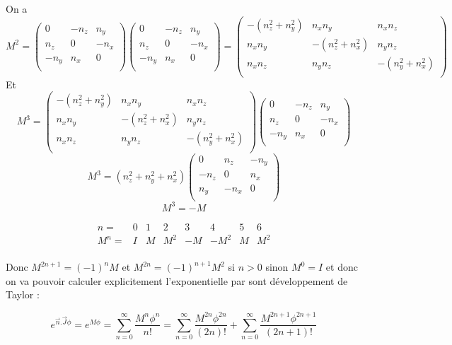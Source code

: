\documentclass[12pt,a4paper]{article}
\begin{document}
	On a 
	\[
	M^2=\begin{pmatrix}
	0&-n_z&n_y\\
	n_z&0&-n_x\\
	-n_y&n_x&0\\
	\end{pmatrix}\begin{pmatrix}
	0&-n_z&n_y\\
	n_z&0&-n_x\\
	-n_y&n_x&0\\
	\end{pmatrix}=\begin{pmatrix}
	-(n_z^2+n_y^2)&n_x n_y& n_x n_z\\
	n_x n_y&-(n_z^2+n_x^2)& n_y n_z\\
	n_x n_z&n_y n_z&-(n_y^2+n_x^2)\\
	\end{pmatrix}
	\]
	Et 
	\[
	M^3=\begin{pmatrix}
	-(n_z^2+n_y^2)&n_x n_y& n_x n_z\\
	n_x n_y&-(n_z^2+n_x^2)& n_y n_z\\
	n_x n_z&n_y n_z&-(n_y^2+n_x^2)\\
	\end{pmatrix}\begin{pmatrix}
	0&-n_z&n_y\\
	n_z&0&-n_x\\
	-n_y&n_x&0\\
	\end{pmatrix}
	\]
	\[
	M^3=(n_z^2+n_y^2+n_x^2)
	\begin{pmatrix}
	0&n_z&-n_y\\
	-n_z&0&n_x\\
	n_y&-n_x&0\\
	\end{pmatrix}
	\]
	\[
	\boxed{M^3=-M}
	\]
	
	\[
		\begin{array}{c|ccccccc}
		n=&0&1&2&3&4&5&6\\
		\hline
		M^n=&I&M&M^2&-M&-M^2&M&M^2\\
		\end{array}
	\]
	
	
	Donc $M^{2n+1}=(-1)^{n} M$ et $M^{2n}=(-1)^{n+1} M^2$ si $n>0$ sinon $M^0=I$ et donc on va pouvoir calculer explicitement l'exponentielle par sont développement de Taylor :
	
	\[
	e^{\vec{n}.\vec{J}\phi}=e^{M\phi} = \sum_{n=0}^{\infty} \frac{M^n\phi^n}{n!}=\sum_{n=0}^{\infty} \frac{M^{2n}\phi^{2n}}{(2n)!} + \sum_{n=0}^{\infty} \frac{M^{2n+1}\phi^{2n+1}}{(2n+1)!}
	\]
	
\end{document}
